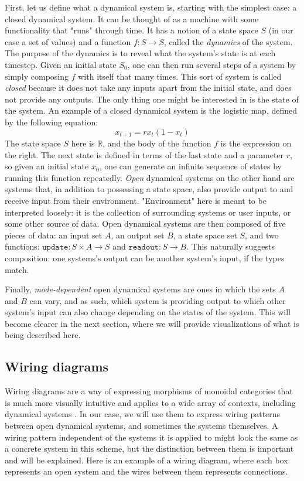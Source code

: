First, let us define what a dynamical system is, starting with the simplest case: a closed dynamical system. It can be thought of as a machine with some functionality that "runs" through time. It has a notion of a state space $S$ (in our case a set of values) and a function $f : S \rightarrow S$, called the \textit{dynamics} of the system. The purpose of the dynamics is to reveal what the system's state is at each timestep. Given an initial state $S_0$, one can then run several steps of a system by simply composing $f$ with itself that many times. This sort of system is called \textit{closed} because it does not take any inputs apart from the initial state, and does not provide any outputs. The only thing one might be interested in is the state of the system. An example of a closed dynamical system is the logistic map, defined by the following equation:
$$
x_{t+1} = rx_t(1 - x_t)
$$
The state space $S$ here is $\mathbb{R}$, and the body of the function $f$ is the expression on the right. The next state is defined in terms of the last state and a parameter $r$, so given an initial state $x_0$, one can generate an infinite sequence of states by running this function repeatedly.
\textit{Open} dynamical systems on the other hand are systems that, in addition to possessing a state space, also provide output to and receive input from their environment. "Environment" here is meant to be interpreted loosely: it is the collection of surrounding systems or user inputs, or some other source of data. Open dynamical systems are then composed of five pieces of data: an input set $A$, an output set $B$, a state space set $S$, and two functions: $\texttt{update} : S \times A \rightarrow S$ and $\texttt{readout} : S \rightarrow B$.  This naturally suggests composition: one systems's output can be another system's input, if the types match.

Finally, \textit{mode-dependent} open dynamical systems are ones in which the sets $A$ and $B$ can vary, and as such, which system is providing output to which other system's input can also change depending on the states of the system. This will become clearer in the next section, where we will provide visualizations of what is being described here.

\subsection{Wiring diagrams}

Wiring diagrams are a way of expressing morphisms of monoidal categories that is much more visually intuitive and applies to a wide array of contexts, including dynamical systems \cite{operadwd}. In our case, we will use them to express wiring patterns between open dynamical systems, and sometimes the systems themselves. A wiring pattern independent of the systems it is applied to might look the same as a concrete system in this scheme, but the distinction between them is important and will be explained. Here is an example of a wiring diagram, where each box represents an open system and the wires between them represents connections.

